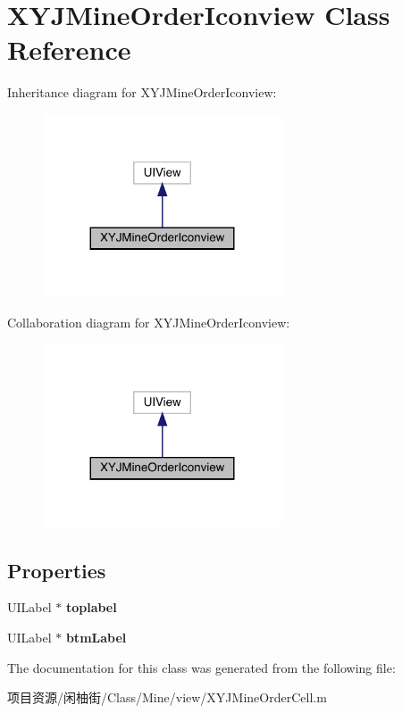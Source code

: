 \hypertarget{interface_x_y_j_mine_order_iconview}{}\section{X\+Y\+J\+Mine\+Order\+Iconview Class Reference}
\label{interface_x_y_j_mine_order_iconview}


Inheritance diagram for X\+Y\+J\+Mine\+Order\+Iconview\+:\nopagebreak
\begin{figure}[H]
\begin{center}
\leavevmode
\includegraphics[width=200pt]{interface_x_y_j_mine_order_iconview__inherit__graph}
\end{center}
\end{figure}


Collaboration diagram for X\+Y\+J\+Mine\+Order\+Iconview\+:\nopagebreak
\begin{figure}[H]
\begin{center}
\leavevmode
\includegraphics[width=200pt]{interface_x_y_j_mine_order_iconview__coll__graph}
\end{center}
\end{figure}
\subsection*{Properties}
\begin{DoxyCompactItemize}
\item 
\mbox{\label{interface_x_y_j_mine_order_iconview_ae31952a6b0606c008e93bd6aad6d823f}} 
U\+I\+Label $\ast$ {\bfseries toplabel}
\item 
\mbox{\label{interface_x_y_j_mine_order_iconview_adb660db73271ba2a1df56b128836990b}} 
U\+I\+Label $\ast$ {\bfseries btm\+Label}
\end{DoxyCompactItemize}


The documentation for this class was generated from the following file\+:\begin{DoxyCompactItemize}
\item 
项目资源/闲柚街/\+Class/\+Mine/view/X\+Y\+J\+Mine\+Order\+Cell.\+m\end{DoxyCompactItemize}
